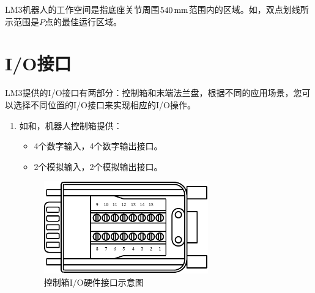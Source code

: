 LM3机器人的工作空间是指底座关节周围$540\,\mathrm{mm}$范围内的区域。如，双点划线所示范围是$\!P\!$点的最佳运行区域。


\section{I/O接口}

LM3提供的I/O接口有两部分：控制箱和末端法兰盘，根据不同的应用场景，您可以选择不同位置的I/O接口来实现相应的I/O操作。


\begin{enumerate}
    \item 如和，机器人控制箱提供：
    \begin{itemize}
        \item 4个数字输入，4个数字输出接口。
        \item 2个模拟输入，2个模拟输出接口。
    \end{itemize}

\begin{figure}[htb!]
    \centering
    \includegraphics[height=4cm]{line_graphs/robot_box_io_plugin.pdf}
    \caption{控制箱I/O硬件接口示意图}
    \label{fig:控制箱IO}
\end{figure}




\end{enumerate}
